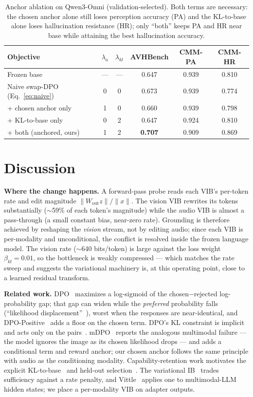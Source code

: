 \documentclass{article}
\begin{document}
\begin{table}[tb]\centering\small
\caption{Anchor ablation on Qwen3-Omni (validation-selected). Both terms are necessary: the chosen anchor
alone still loses perception accuracy (PA) and the KL-to-base alone loses hallucination resistance (HR);
only ``both'' keeps PA and HR near base while attaining the best hallucination accuracy.}
\label{tab:abl}
\begin{tabular}{lccccc}
\toprule
Objective & $\lambda_a$ & $\lambda_{kl}$ & AVHBench & CMM-PA & CMM-HR \\
\midrule
Frozen base                 & --- & --- & 0.647 & 0.939 & 0.810 \\
Naive swap-DPO (Eq.~\ref{eq:naive}) & 0 & 0 & 0.673 & 0.939 & 0.774 \\
\quad + chosen anchor only  & 1 & 0 & 0.660 & 0.939 & 0.798 \\
\quad + KL-to-base only      & 0 & 2 & 0.647 & 0.924 & 0.810 \\
\quad + both (anchored, ours) & 1 & 2 & \textbf{0.707} & 0.909 & 0.869 \\
\bottomrule
\end{tabular}
\end{table}

\section{Discussion}
\label{sec:interp}
\textbf{Where the change happens.} A forward-pass probe reads each VIB's per-token rate and edit magnitude
$\|W_{\text{out}}z\|/\|x\|$. The vision VIB rewrites its tokens substantially ($\sim$59\% of each token's
magnitude) while the audio VIB is almost a pass-through (a small constant bias, near-zero rate). Grounding
is therefore achieved by reshaping the \emph{vision} stream, not by editing audio; since each VIB is
per-modality and unconditional, the conflict is resolved inside the frozen language model. The vision rate
($\sim$640 bits/token) is large against the loss weight $\beta_{kl}{=}0.01$, so the bottleneck is weakly
compressed --- which matches the rate sweep and suggests the variational machinery is, at this operating
point, close to a learned residual transform.

\textbf{Related work.} DPO~\cite{dpo} maximizes a log-sigmoid of the chosen$-$rejected log-probability gap;
that gap can widen while the \emph{preferred} probability falls (``likelihood displacement''~\cite{razin}),
worst when the responses are near-identical, and DPO-Positive~\cite{dpop} adds a floor on the chosen term.
DPO's KL constraint is implicit and acts only on the pairs~\cite{dpovsppo}. mDPO~\cite{mdpo} reports the
analogous multimodal failure --- the model ignores the image as its chosen likelihood drops --- and adds a
conditional term and reward anchor; our chosen anchor follows the same principle with audio as the
conditioning modality. Capability-retention work motivates the explicit KL-to-base~\cite{instructgpt,gao}
and held-out selection~\cite{ivison}. The variational IB~\cite{vib} trades sufficiency against a rate
penalty, and Vittle~\cite{vittle} applies one to multimodal-LLM hidden states; we place a per-modality VIB
on adapter outputs.
\end{document}
